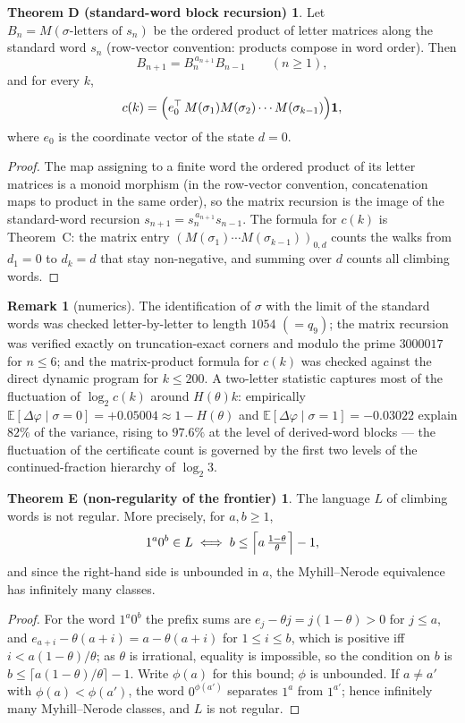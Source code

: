 \documentclass[11pt]{article}
\theoremstyle{definition}
\newtheorem{remark}[theorem]{Remark}
\newtheorem*{thmD}{Theorem D (standard-word block recursion)}
\newtheorem*{thmE}{Theorem E (non-regularity of the frontier)}
\newcommand{\ceil}[1]{\lceil #1\rceil}
\begin{document}
\begin{thmD}
Let $B_n=M(\sigma\text{-letters of } s_n)$ be the ordered product of letter
matrices along the standard word $s_n$ (row-vector convention: products
compose in word order). Then
\[
B_{n+1}=B_n^{\,a_{n+1}}B_{n-1}\qquad (n\ge 1),
\]
and for every $k$,
\[
c(k)=\Bigl(e_0^{\top} \,M(\sigma_1)M(\sigma_2)\cdots M(\sigma_{k-1})\Bigr)\mathbf 1 ,
\]
where $e_0$ is the coordinate vector of the state $d=0$.
\end{thmD}

\begin{proof}
The map assigning to a finite word the ordered product of its letter
matrices is a monoid morphism (in the row-vector convention, concatenation
maps to product in the same order), so the matrix recursion is the image of
the standard-word recursion $s_{n+1}=s_n^{\,a_{n+1}}s_{n-1}$. The formula
for $c(k)$ is Theorem~C: the matrix entry
$(M(\sigma_1)\cdots M(\sigma_{k-1}))_{0,d}$ counts the walks from $d_1=0$
to $d_k=d$ that stay non-negative, and summing over $d$ counts all
climbing words.
\end{proof}

\begin{remark}[numerics]\label{rem:sturmnum}
The identification of $\sigma$ with the limit of the standard words was
checked letter-by-letter to length $1054$ $(=q_9)$; the matrix recursion
was verified exactly on truncation-exact corners and modulo the prime
$3000017$ for $n\le 6$; and the matrix-product formula for $c(k)$ was
checked against the direct dynamic program for $k\le 200$. A two-letter
statistic captures most of the fluctuation of $\log_2 c(k)$ around
$H(\theta)k$: empirically
$\mathbb{E}[\Delta\varphi\mid\sigma=0]=+0.05004\approx 1-H(\theta)$ and
$\mathbb{E}[\Delta\varphi\mid\sigma=1]=-0.03022$ explain $82\%$ of the
variance, rising to $97.6\%$ at the level of derived-word blocks --- the
fluctuation of the certificate count is governed by the first two levels of
the continued-fraction hierarchy of $\log_2 3$.
\end{remark}

\begin{thmE}
The language $L$ of climbing words is not regular. More precisely, for
$a,b\ge 1$,
\[
1^a0^b\in L \iff b\le \Bigl\lceil a\,\tfrac{1-\theta}{\theta}\Bigr\rceil-1 ,
\]
and since the right-hand side is unbounded in $a$, the Myhill--Nerode
equivalence has infinitely many classes.
\end{thmE}

\begin{proof}
For the word $1^a0^b$ the prefix sums are $e_j-\theta j=j(1-\theta)>0$ for
$j\le a$, and $e_{a+i}-\theta(a+i)=a-\theta(a+i)$ for $1\le i\le b$, which
is positive iff $i<a(1-\theta)/\theta$; as $\theta$ is irrational, equality
is impossible, so the condition on $b$ is
$b\le\ceil{a(1-\theta)/\theta}-1$. Write $\phi(a)$ for this bound; $\phi$
is unbounded. If $a\ne a'$ with $\phi(a)<\phi(a')$, the word $0^{\phi(a')}$
separates $1^{a}$ from $1^{a'}$; hence infinitely many Myhill--Nerode
classes, and $L$ is not regular.
\end{proof}
\end{document}
